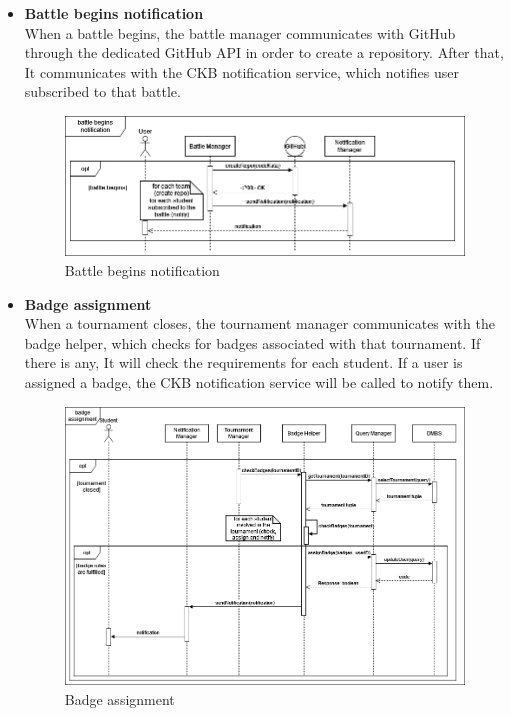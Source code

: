 \begin{itemize}
    \item \textbf{Battle begins notification}\\
    When a battle begins, the battle manager communicates with GitHub through the dedicated GitHub API in order to create a repository. After that, It communicates with the CKB notification 
    service, which notifies user subscribed to that battle.
    \begin{figure}[h]
        \centering
        \includegraphics[width=1\linewidth]{src/Battle begins notification.png}
        \caption{Battle begins notification}
        \label{fig:Battle begins notification}
    \end{figure}
    \newpage
    \item \textbf{Badge assignment}\\
    When a tournament closes, the tournament manager communicates with the badge helper, which checks for badges associated with that tournament. If there is any, It will check the 
    requirements for each student. If a user is assigned a badge, the CKB notification service will be called to notify them.
    \begin{figure}[h]
        \centering
        \includegraphics[width=1\linewidth]{src/Badge assignment.png}
        \caption{Badge assignment}
        \label{fig:Badge assignment}
    \end{figure}
\end{itemize}

